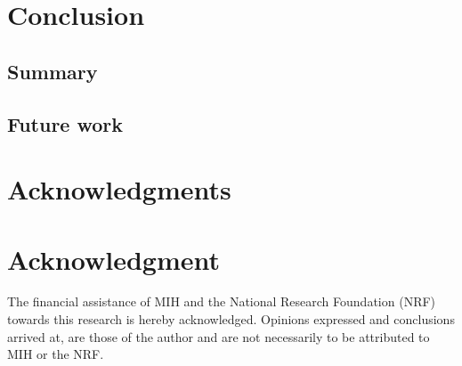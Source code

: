 \documentclass[10pt,a4paper,conference]{IEEEtran}
\begin{document}
\section{Conclusion}
\label{conclusion}

\subsection{Summary}

\subsection{Future work}


\ifCLASSOPTIONcompsoc
  \section*{Acknowledgments}
\else
  \section*{Acknowledgment}
\fi

The financial assistance of MIH and the National Research Foundation (NRF) towards this research is hereby acknowledged. Opinions expressed and
conclusions arrived at, are those of the author and are not necessarily to be attributed to MIH or the NRF.




\end{document}
